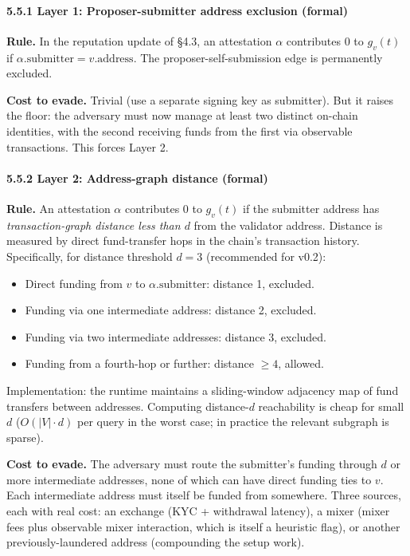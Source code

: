 \documentclass[
  11pt,
]{article}
\newcounter{none} %
\providecommand{\tightlist}{%
  \setlength{\itemsep}{0pt}\setlength{\parskip}{0pt}}
\begin{document}
\paragraph{5.5.1 Layer 1: Proposer-submitter address exclusion
(formal)}\label{layer-1-proposer-submitter-address-exclusion-formal}

\textbf{Rule.} In the reputation update of §4.3, an attestation
\(\alpha\) contributes 0 to \(g_v(t)\) if
\(\alpha.\text{submitter} = v.\text{address}\). The
proposer-self-submission edge is permanently excluded.

\textbf{Cost to evade.} Trivial (use a separate signing key as
submitter). But it raises the floor: the adversary must now manage at
least two distinct on-chain identities, with the second receiving funds
from the first via observable transactions. This forces Layer 2.

\paragraph{5.5.2 Layer 2: Address-graph distance
(formal)}\label{layer-2-address-graph-distance-formal}

\textbf{Rule.} An attestation \(\alpha\) contributes 0 to \(g_v(t)\) if
the submitter address has \emph{transaction-graph distance less than
\(d\)} from the validator address. Distance is measured by direct
fund-transfer hops in the chain's transaction history. Specifically, for
distance threshold \(d = 3\) (recommended for v0.2):

\begin{itemize}
\tightlist
\item
  Direct funding from \(v\) to \(\alpha.\text{submitter}\): distance 1,
  excluded.
\item
  Funding via one intermediate address: distance 2, excluded.
\item
  Funding via two intermediate addresses: distance 3, excluded.
\item
  Funding from a fourth-hop or further: distance \(\geq 4\), allowed.
\end{itemize}

Implementation: the runtime maintains a sliding-window adjacency map of
fund transfers between addresses. Computing distance-\(d\) reachability
is cheap for small \(d\) (\(O(|V| \cdot d)\) per query in the worst
case; in practice the relevant subgraph is sparse).

\textbf{Cost to evade.} The adversary must route the submitter's funding
through \(d\) or more intermediate addresses, none of which can have
direct funding ties to \(v\). Each intermediate address must itself be
funded from somewhere. Three sources, each with real cost: an exchange
(KYC + withdrawal latency), a mixer (mixer fees plus observable mixer
interaction, which is itself a heuristic flag), or another
previously-laundered address (compounding the setup work).
\end{document}
